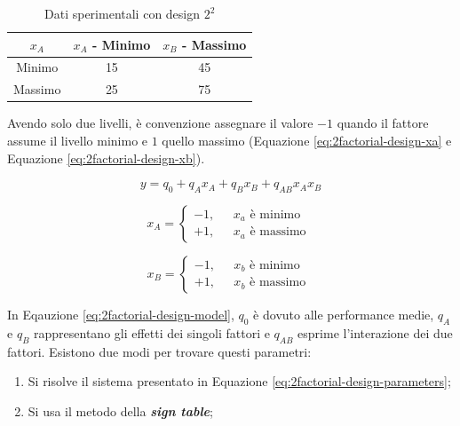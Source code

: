 \documentclass{article}
\begin{document}
\begin{table}
  \begin{center}
    \begin{tabular}[c]{|c|c|c|}
      \hline
      \multicolumn{1}{|c|}{\textbf{$x_A$}} & 
      \multicolumn{1}{c|}{\textbf{$x_A$ - Minimo}} & 
      \multicolumn{1}{c|}{\textbf{$x_B$ - Massimo}} \\

      \hline
      Minimo & 15 & 45 \\
      Massimo & 25 & 75\\

      \hline
    \end{tabular}
    \caption{Dati sperimentali con design $2^2$}\label{tab:experimental-design}
  \end{center}
\end{table}

Avendo solo due livelli, è convenzione assegnare 
il valore $-1$ quando il fattore assume il livello minimo e $1$ quello massimo (Equazione 
\ref{eq:2factorial-design-xa} e Equazione \ref{eq:2factorial-design-xb}).

\begin{equation}
  y = q_0 + q_A x_A + q_B x_B + q_{AB} x_Ax_B
  \label{eq:2factorial-design-model}
\end{equation}

\begin{equation}
  x_A = 
  \begin{cases}
    -1, &\text{ $x_a$ è minimo }\\
    +1, &\text{ $x_a$ è massimo }
  \end{cases}
  \label{eq:2factorial-design-xa}
\end{equation}

\begin{equation}
  x_B = 
  \begin{cases}
    -1, &\text{ $x_b$ è minimo }\\
    +1, &\text{ $x_b$ è massimo }
  \end{cases}
  \label{eq:2factorial-design-xb}
\end{equation}

In Eqauzione \ref{eq:2factorial-design-model}, $q_0$ è dovuto alle performance medie, 
$q_A$ e $q_B$ rappresentano gli effetti dei singoli fattori e $q_{AB}$ esprime l'interazione 
dei due fattori. Esistono due modi per trovare questi parametri:
\begin{enumerate}
  \item Si risolve il sistema presentato in Equazione \ref{eq:2factorial-design-parameters};
  \item Si usa il metodo della \textbf{\textit{sign table}};
\end{enumerate}
\end{document}
